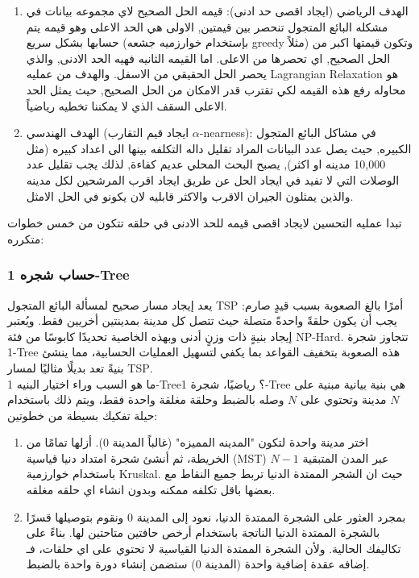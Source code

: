 \documentclass{article}
\newcommand{\en}[1]{\textenglish{#1}}
\begin{document}
\begin{enumerate}
	\item الهدف الرياضي (ايجاد اقصى حد ادنى):
قيمه الحل الصحيح لاي مجموعه بيانات في مشكله البائع المتجول تنحصر بين قيمتين, الاولى هي الحد الاعلى وهو قيمه يتم حسابها بشكل سريع (بإستخدام خوارزميه جشعه \en{greedy} مثلاً) وتكون قيمتها اكبر من الحل الصحيح, اي تحصرها من الاعلى. اما القيمه الثانيه فهيه الحد الادنى, والذي يحصر الحل الحقيقي من الاسفل. والهدف من عمليه \en{Lagrangian Relaxation} هو محاوله رفع هذه القيمه لكي تقترب قدر الامكان من الحل الصحيح, حيث يمثل الحد الاعلى السقف الذي لا يمكننا تخطيه رياضياً.

	\item الهدف الهندسي (ايجاد قيم التقارب \en{$\alpha$-nearness}):
في مشاكل البائع المتجول الكبيره, حيث يصل عدد البيانات المراد تقليل داله التكلفه بينها الى اعداد كبيره (مثل 10,000 مدينه او اكثر), يصبح البحث المحلي عديم كفاءة, لذلك يجب تقليل عدد الوصلات التي لا تفيد في ايجاد الحل عن طريق ايجاد اقرب المرشحين لكل مدينه والذين يمثلون الجيران الاقرب والاكثر قابليه لان يكونو في الحل الامثل.
\end{enumerate}

تبدا عمليه التحسين لايجاد اقصى قيمه للحد الادنى في حلقه تتكون من خمس خطوات متكرره:

\subsubsection{حساب شجره \en{1-Tree}}
يعد إيجاد مسار صحيح لمسألة البائع المتجول \en{TSP} أمرًا بالغ الصعوبة بسبب قيدٍ صارم: يجب أن يكون حلقةً واحدةً متصلة حيث تتصل كل مدينة بمدينتين أخريين فقط. ويُعتبر إيجاد بنيةٍ ذات وزنٍ أدنى وبهذه الخاصية تحديدًا كابوسًا من فئة NP-Hard. تتجاوز شجرة \en{1-Tree} هذه الصعوبة بتخفيف القواعد بما يكفي لتسهيل العمليات الحسابية، مما ينشئ بنيةً تعد بديلًا مثاليًا لمسار \en{TSP}.\\

ما هو السبب وراء اختيار البنيه \en{1-Tree}؟ رياضيًا، شجرة \en{1-Tree} هي بنية بيانية مبنية على $N$ مدينة وتحتوي على $N$ وصله بالضبط وحلقة مغلقة واحدة فقط، ويتم ذلك باستخدام حيلة تفكيك بسيطة من خطوتين:

	\begin{enumerate}
		\item اختر مدينة واحدة لتكون "المدينه المميزه" (غالباً المدينة 0).
أزلها تمامًا من الخريطة، ثم أنشئ شجرة امتداد دنيا قياسية (\en{MST}) عبر المدن المتبقية $N-1$ باستخدام خوارزمية \en{Kruskal}. حيث ان الشجر الممتدة الدنيا تربط جميع النقاط مع بعضها باقل تكلفه ممكنه وبدون انشاء اي حلقه مغلقه.

		\item بمجرد العثور على الشجرة الممتدة الدنيا،
نعود إلى المدينة 0 ونقوم بتوصيلها قسرًا بالشجرة الممتدة الدنيا الناتجة باستخدام أرخص حافتين متاحتين لها. بناءً على تكاليفك الحالية. ولأن الشجرة الممتدة الدنيا القياسية لا تحتوي على اي حلقات، فـ إضافه عقدة إضافية واحدة (المدينة 0) ستضمن إنشاء دورة واحدة بالضبط.\\
	\end{enumerate}
\end{document}
